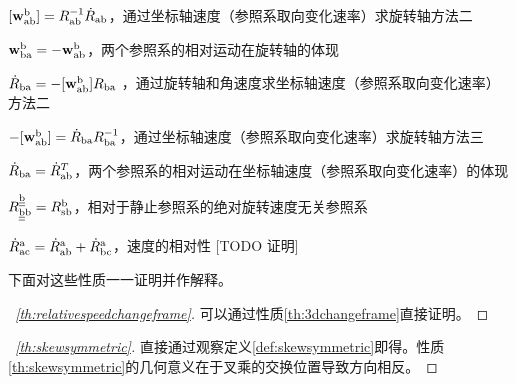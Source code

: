 \documentclass[12pt, a4paper, article, UTF8]{ctexart}
\begin{document}
\begin{mytheorem}
$[\mathbf{w}_\textnormal{ab}^\textnormal{b}] = R_\textnormal{ab}^{-1}\dot{R}_\textnormal{ab}$，通过坐标轴速度（参照系取向变化速率）求旋转轴方法二 \label{th:computewabb}
\end{mytheorem}

\begin{mytheorem}
$\mathbf{w}_\textnormal{ba}^\textnormal{b} = -\mathbf{w}_\textnormal{ab}^\textnormal{b}$，两个参照系的相对运动在旋转轴的体现 \label{th:reverserelativemotion}
\end{mytheorem}

\begin{mytheorem}
$\dot{R}_\textnormal{ba} = -[\mathbf{w}_\textnormal{ab}^\textnormal{b}]R_\textnormal{ba}$ ，通过旋转轴和角速度求坐标轴速度（参照系取向变化速率）方法二\label{th:computedotrba}
\end{mytheorem}

\begin{mytheorem}
$-[\mathbf{w}_\textnormal{ab}^\textnormal{b}] = \dot{R}_\textnormal{ba}R_\textnormal{ba}^{-1}$，通过坐标轴速度（参照系取向变化速率）求旋转轴方法三 \label{th:computeminuswabb}
\end{mytheorem}

\begin{mytheorem}
$ \dot{R}_\textnormal{ba} = \dot{R}_\textnormal{ab}^T$，两个参照系的相对运动在坐标轴速度（参照系取向变化速率）的体现  \label{th:velocitytranspose}
\end{mytheorem}

\begin{mytheorem}
$R_{\textnormal{\underline{\underline{b}}b}}^\textnormal{\underline{\underline{b}}} = R_{\textnormal{sb}}^{\textnormal{b}} $，相对于静止参照系的绝对旋转速度无关参照系  \label{th:bstarvelocity}
\end{mytheorem}

\begin{mytheorem}
$\dot{R}_\textnormal{ac}^\textnormal{a}
 = \dot{R}_\textnormal{ab}^\textnormal{a} + \dot{R}_\textnormal{bc}^\textnormal{a} $，速度的相对性 [TODO 证明]  \label{th:velocityrelativity}
\end{mytheorem}

下面对这些性质一一证明并作解释。

\begin{proof}[\proofname\ \ref{th:relativespeedchangeframe}]
可以通过性质\ref{th:3dchangeframe}直接证明。
\end{proof}

\begin{proof}[\proofname\ \ref{th:skewsymmetric}]
直接通过观察定义\ref{def:skewsymmetric}即得。性质\ref{th:skewsymmetric}的几何意义在于叉乘的交换位置导致方向相反。
\end{proof}
\end{document}
